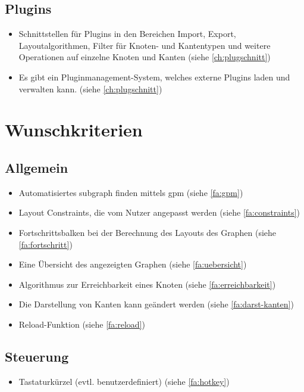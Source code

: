 \subsection{Plugins}
  \begin{itemize}
    \item Schnittstellen für Plugins in den Bereichen Import, Export, Layoutalgorithmen, Filter für Knoten- und Kantentypen und weitere Operationen auf einzelne Knoten und Kanten (siehe \autoref{ch:plugschnitt})
    \item Es gibt ein Pluginmanagement-System, welches externe Plugins laden und verwalten kann. (siehe \autoref{ch:plugschnitt})
  \end{itemize}

\section{Wunschkriterien}

\subsection{Allgemein}
  \begin{itemize}
    \item Automatisiertes \gls{subgraph} finden mittels \gls{gpm} (siehe \ref{fa:gpm})
    \item Layout Constraints, die vom Nutzer angepasst werden (siehe \ref{fa:constraints})
    \item Fortschrittsbalken bei der Berechnung des Layouts des Graphen (siehe \ref{fa:fortschritt})
    \item Eine Übersicht des angezeigten Graphen (siehe \ref{fa:uebersicht})
    \item Algorithmus zur Erreichbarkeit eines Knoten (siehe \ref{fa:erreichbarkeit})
    \item Die Darstellung von Kanten kann geändert werden (siehe \ref{fa:darst-kanten})
    \item Reload-Funktion (siehe \ref{fa:reload})
  \end{itemize}

\subsection{Steuerung}
  \begin{itemize}
    \item Tastaturkürzel (evtl. benutzerdefiniert) (siehe \ref{fa:hotkey})
  \end{itemize}

